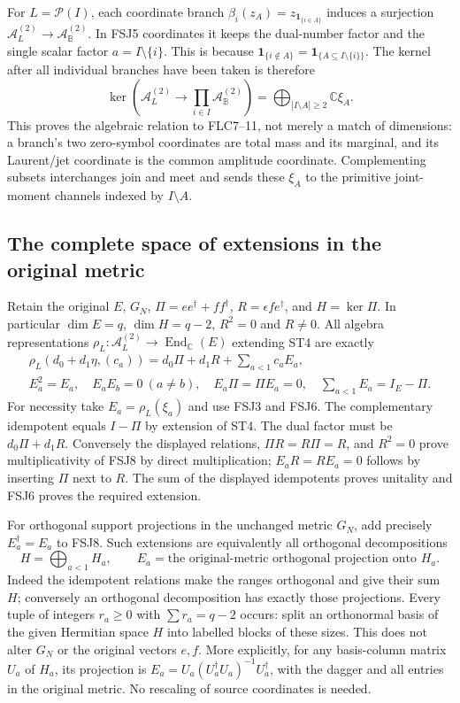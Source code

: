 \documentclass[11pt]{article}
\begin{document}
For $L=\mathcal P(I)$, each coordinate branch
$\beta_i(z_A)=z_{\mathbf1_{\{i\in A\}}}$ induces a surjection
$\mathcal A_L^{(2)}\to\mathcal A_{\mathbb B}^{(2)}$.
In FSJ5 coordinates it keeps the dual-number factor and the
single scalar factor $a=I\setminus\{i\}$. This is because
$\mathbf1_{\{i\notin A\}}=\mathbf1_{\{A\subseteq I\setminus\{i\}\}}$.
The kernel after all individual branches have been taken is therefore
\[
\ker\!\left(\mathcal A_L^{(2)}\longrightarrow
 \prod_{i\in I}\mathcal A_{\mathbb B}^{(2)}\right)
 =\bigoplus_{|I\setminus A|\ge2}\mathbb C\xi_A.
\tag{FSJ7}
\]
This proves the algebraic relation to FLC7--11, not merely a match
of dimensions: a branch's two zero-symbol coordinates are total
mass and its marginal, and its Laurent/jet coordinate is the common
amplitude coordinate. Complementing subsets interchanges join and
meet and sends these $\xi_A$ to the primitive joint-moment channels
indexed by $I\setminus A$.

\subsection{The complete space of extensions in the original metric}
Retain the original $E$, $G_N$, $\Pi=ee^\dagger+ff^\dagger$,
$R=\epsilon fe^\dagger$, and $H=\ker\Pi$. In particular
$\dim E=q$, $\dim H=q-2$, $R^2=0$ and $R\ne0$.
All algebra representations $\rho_L:\mathcal A_L^{(2)}\to
\operatorname{End}_{\mathbb C}(E)$ extending ST4 are exactly
\[
\begin{gathered}
\rho_L(d_0+d_1\eta,(c_a))
 =d_0\Pi+d_1R+\sum_{a<1}c_aE_a,\\
E_a^2=E_a,\quad E_aE_b=0\ (a\ne b),\quad
E_a\Pi=\Pi E_a=0,\quad \sum_{a<1}E_a=I_E-\Pi.
\end{gathered}
\tag{FSJ8}
\]
For necessity take $E_a=\rho_L(\xi_a)$ and use FSJ3 and FSJ6.
The complementary idempotent equals $I-\Pi$ by extension of ST4.
The dual factor must be $d_0\Pi+d_1R$. Conversely the displayed
relations, $\Pi R=R\Pi=R$, and $R^2=0$ prove multiplicativity of
FSJ8 by direct multiplication; $E_aR=RE_a=0$ follows by inserting
$\Pi$ next to $R$. The sum of the displayed idempotents proves
unitality and FSJ6 proves the required extension.

For orthogonal support projections in the unchanged metric $G_N$,
add precisely $E_a^\dagger=E_a$ to FSJ8. Such extensions are
equivalently all orthogonal decompositions
\[
H=\bigoplus_{a<1}H_a,
\qquad E_a=\text{the original-metric orthogonal projection onto }H_a.
\tag{FSJ9}
\]
Indeed the idempotent relations make the ranges orthogonal and give
their sum $H$; conversely an orthogonal decomposition has exactly
those projections. Every tuple of integers $r_a\ge0$ with
$\sum r_a=q-2$ occurs: split an orthonormal basis of the given
Hermitian space $H$ into labelled blocks of these sizes. This does
not alter $G_N$ or the original vectors $e,f$. More explicitly,
for any basis-column matrix $U_a$ of $H_a$, its projection is
$E_a=U_a(U_a^\dagger U_a)^{-1}U_a^\dagger$, with the dagger and
all entries in the original metric. No rescaling of source
coordinates is needed.
\end{document}
